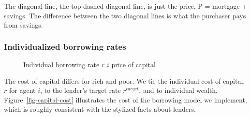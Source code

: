 {  
The diagonal line, the top dashed diagonal line, is just the price, P = mortgage + savings.
The difference between the two diagonal lines is what the purchaser pays from savings.  

\subsubsection{Individualized borrowing rates} \label{sec:borowing-rate}

    \begin{figure}
    \centering
    \label{fig-capital-cost}
    \caption{Individual borrowing rate $r\_i$ price of capital}
    \label{fig:Wealth-based}
    \end{figure}

The cost of capital differs for rich and poor. We tie the individual cost of capital,  ${r}$ for agent $i$, to the lender's target rate $r^{target}$, and to individual wealth. Figure~\ref{fig-capital-cost} illustrates the cost of the borrowing model we implement, which is  roughly consistent  with the stylized facts about lenders. 
 
}
